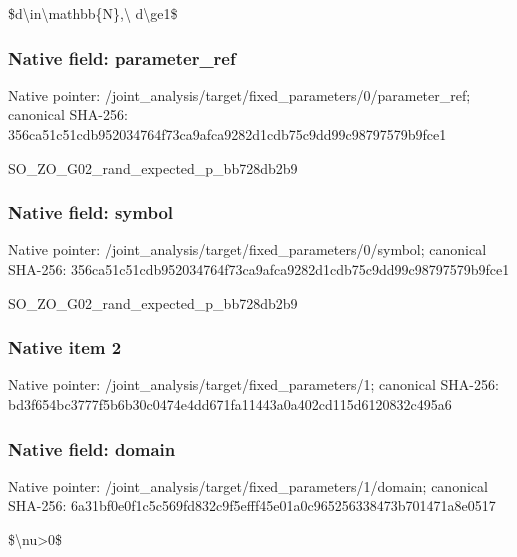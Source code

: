 \documentclass[10pt,a4paper]{article}
\begin{document}
\begingroup\raggedright\sloppy \$d\textbackslash{}in\textbackslash{}mathbb\{N\},\allowbreak{}\textbackslash{} d\textbackslash{}ge1\$\par\endgroup

\subsubsection{Native field: parameter\_\allowbreak{}ref}
Native pointer: /joint\_\allowbreak{}analysis/target/fixed\_\allowbreak{}parameters/0/parameter\_\allowbreak{}ref; canonical SHA-256: 356ca51c51cdb952034764f73ca9afca9282d1cdb75c9dd99c98797579b9fce1

\begingroup\raggedright\sloppy SO\_\allowbreak{}ZO\_\allowbreak{}G02\_\allowbreak{}rand\_\allowbreak{}expected\_\allowbreak{}p\_\allowbreak{}bb728db2b9\par\endgroup

\subsubsection{Native field: symbol}
Native pointer: /joint\_\allowbreak{}analysis/target/fixed\_\allowbreak{}parameters/0/symbol; canonical SHA-256: 356ca51c51cdb952034764f73ca9afca9282d1cdb75c9dd99c98797579b9fce1

\begingroup\raggedright\sloppy SO\_\allowbreak{}ZO\_\allowbreak{}G02\_\allowbreak{}rand\_\allowbreak{}expected\_\allowbreak{}p\_\allowbreak{}bb728db2b9\par\endgroup

\subsubsection{Native item 2}
Native pointer: /joint\_\allowbreak{}analysis/target/fixed\_\allowbreak{}parameters/1; canonical SHA-256: bd3f654bc3777f5b6b30c0474e4dd671fa11443a0a402cd115d6120832c495a6

\subsubsection{Native field: domain}
Native pointer: /joint\_\allowbreak{}analysis/target/fixed\_\allowbreak{}parameters/1/domain; canonical SHA-256: 6a31bf0e0f1c5c569fd832c9f5efff45e01a0c965256338473b701471a8e0517

\begingroup\raggedright\sloppy \$\textbackslash{}nu>0\$\par\endgroup
\end{document}
